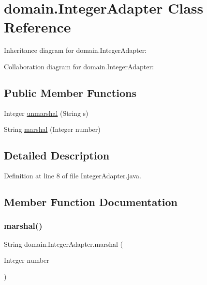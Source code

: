 \hypertarget{classdomain_1_1IntegerAdapter}{}\section{domain.\+Integer\+Adapter Class Reference}
\label{classdomain_1_1IntegerAdapter}


Inheritance diagram for domain.\+Integer\+Adapter\+:


Collaboration diagram for domain.\+Integer\+Adapter\+:
\subsection*{Public Member Functions}
\begin{DoxyCompactItemize}
\item 
Integer \mbox{\hyperlink{classdomain_1_1IntegerAdapter_ad2bfc5af140573682dd03906b9264b51}{unmarshal}} (String s)
\item 
String \mbox{\hyperlink{classdomain_1_1IntegerAdapter_a407b4872b78e54ed80c9ae597cae2451}{marshal}} (Integer number)
\end{DoxyCompactItemize}


\subsection{Detailed Description}


Definition at line 8 of file Integer\+Adapter.\+java.



\subsection{Member Function Documentation}
\mbox{\label{classdomain_1_1IntegerAdapter_a407b4872b78e54ed80c9ae597cae2451}} 
\subsubsection{\texorpdfstring{marshal()}{marshal()}}
{\footnotesize\ttfamily String domain.\+Integer\+Adapter.\+marshal (\begin{DoxyParamCaption}\item[{Integer}]{number }\end{DoxyParamCaption})}




